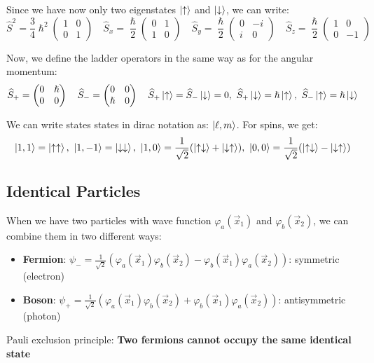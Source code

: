 \documentclass{article}
\begin{document}
Since we have now only two eigenstates $\ket{\uparrow}$ and $\ket{\downarrow}$, we can write:
$$\hat S^2 = \frac{3}{4} \hslash^2 \begin{pmatrix} 1&0\\0&1 \end{pmatrix} \quad \hat S_x = \frac{\hslash}{2} \begin{pmatrix} 0&1\\1&0 \end{pmatrix} \quad \hat S_y = \frac{\hslash}{2} \begin{pmatrix} 0&-i\\i&0 \end{pmatrix} \quad \hat S_z = \frac{\hslash}{2} \begin{pmatrix} 1&0\\0&-1 \end{pmatrix}$$

Now, we define the ladder operators in the same way as for the angular momentum:
$$\widehat{S}_+ = \begin{pmatrix} 0&\hslash\\0&0 \end{pmatrix} \quad \widehat{S}_- = \begin{pmatrix} 0&0\\\hslash&0 \end{pmatrix} \quad \widehat{S}_+ \ket{\uparrow} = \widehat{S}_- \ket{\downarrow} = 0, \ \widehat{S}_+ \ket{\downarrow} = \hslash \ket{\uparrow}, \ \widehat{S}_- \ket{\uparrow} = \hslash \ket{\downarrow}$$

We can write states states in dirac notation as: $\ket{\ell,m}$. For spins, we get:
$$\ket{1,1} = \ket{\uparrow \uparrow}, \ \ket{1,-1} = \ket{\downarrow \downarrow}, \ \ket{1,0} = \frac{1}{\sqrt2}(\ket{\uparrow \downarrow} + \ket{\downarrow \uparrow}), \ \ket{0,0} = \frac{1}{\sqrt2} (\ket{\uparrow \downarrow} - \ket{\downarrow \uparrow}) $$

\subsection{Identical Particles}
When we have two particles with wave function $\varphi_a(\vec x_1)$ and $\varphi_b(\vec x_2)$, we can combine them in two different ways:
\begin{itemize}
	\item \textbf{Fermion}: $\psi_- = \frac{1}{\sqrt2} \left( \varphi_a (\vec x_1) \varphi_b(\vec x_2) - \varphi_b(\vec x_1) \varphi_a (\vec x_2) \right)$: symmetric (electron)
	\item \textbf{Boson}: $\psi_+ = \frac{1}{\sqrt2} \left( \varphi_a (\vec x_1) \varphi_b(\vec x_2) + \varphi_b(\vec x_1) \varphi_a (\vec x_2) \right)$: antisymmetric (photon)
\end{itemize}
Pauli exclusion principle: \textbf{Two fermions cannot occupy the same identical state}
\end{document}
